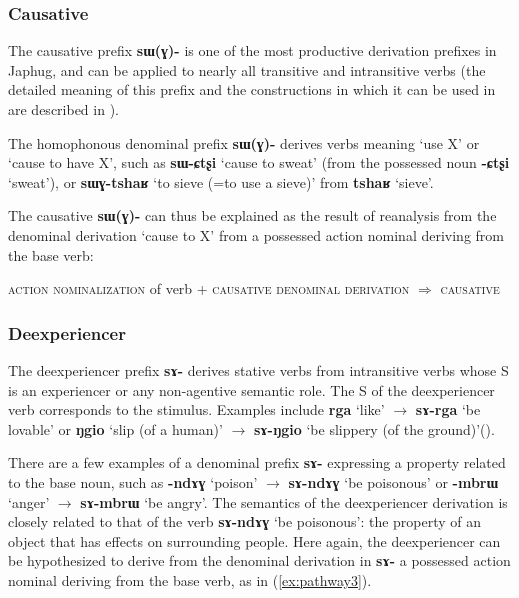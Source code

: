 \documentclass[oldfontcommands,oneside,a4paper,11pt]{article}
\newcommand{\ipa}[1]{\mbox{\phon\textbf{#1}}} %
\begin{document}
\subsubsection{Causative}  \label{sec:causative}
The causative prefix \ipa{sɯ(ɣ)-} is one of the most productive derivation prefixes in Japhug, and can be applied to nearly all transitive and intransitive verbs (the detailed meaning of this prefix and the constructions in which it can be used in are described in \citealt{jacques15causative}). 

 The homophonous denominal prefix \ipa{sɯ(ɣ)-} derives verbs meaning `use X' or `cause to have X', such as \ipa{sɯ-ɕtʂi} `cause to sweat' (from the possessed noun \ipa{-ɕtʂi} `sweat'), or \ipa{sɯɣ-tshaʁ} `to sieve (=to use a sieve)' from \ipa{tshaʁ} `sieve'. 

The causative \ipa{sɯ(ɣ)-} can thus be explained as the result of reanalysis from the denominal derivation `cause to X' from a possessed action nominal deriving from the base verb:

\begin{exe}
\ex \label{ex:pathway2}
\glt \textsc{action nominalization} of verb + \textsc{causative denominal derivation} $\Rightarrow$ \textsc{causative}
\end{exe} 

 


\subsubsection{Deexperiencer} \label{sec:deexp}
 
 The deexperiencer prefix \ipa{sɤ-} derives stative verbs from intransitive verbs whose S is an experiencer or any non-agentive semantic role. The S of the deexperiencer verb corresponds to the stimulus. Examples include \ipa{rga} `like' $\rightarrow$ \ipa{sɤ-rga} `be lovable' or \ipa{ŋgio} `slip (of a human)' $\rightarrow$ \ipa{sɤ-ŋgio} `be slippery (of the ground)'(\citealt{jacques12demotion}).

There are a few examples of a denominal prefix \ipa{sɤ-} expressing a property related to the base noun, such as \ipa{-ndɤɣ} `poison' $\rightarrow$ \ipa{sɤ-ndɤɣ} `be poisonous' or \ipa{-mbrɯ} `anger'  $\rightarrow$ \ipa{sɤ-mbrɯ} `be angry'. The semantics of the deexperiencer derivation is closely related to that of the verb  \ipa{sɤ-ndɤɣ} `be poisonous': the property of an object that has effects on surrounding people. Here again, the deexperiencer can be hypothesized to derive from the denominal derivation in \ipa{sɤ-} a possessed action nominal deriving from the base verb, as in (\ref{ex:pathway3}).
\end{document}
